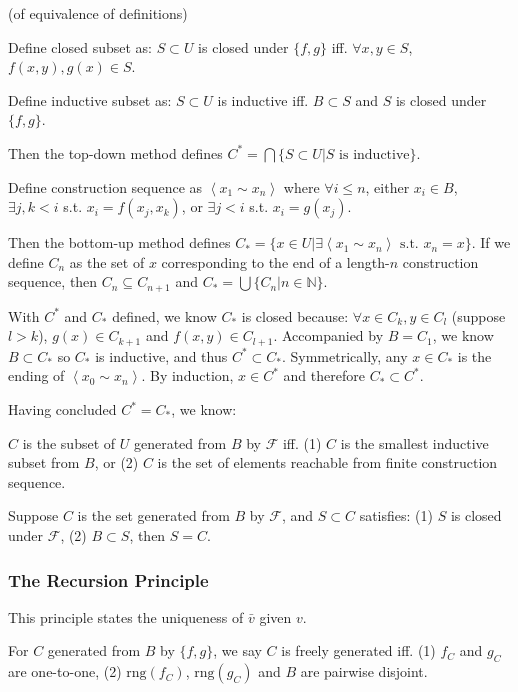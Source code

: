 \documentclass{article}
\newcommand \mlist[1]				{\left\langle #1 \right\rangle}
\newcommand \ran[1]					{\text{rng}\left( #1 \right)}
\begin{document}
\Proof (of equivalence of definitions)

Define closed subset as:
	$S \subset U$ is closed under $\{f,g\}$ iff. $\forall x,y\in S$, $f(x,y), g(x)\in S$.
	
Define inductive subset as:
	$S \subset U$ is inductive iff. $B \subset S$ and $S$ is closed under $\{f,g\}$.
	
	Then the top-down method defines $C^*= \bigcap \{ S\subset U | S \text{ is inductive}\}$.
	
Define construction sequence as $\mlist{x_1\sim x_n}$ where $\forall i \le n$, either  $x_i \in B$,  $\exists j, k<i$ s.t. $x_i=f(x_j,x_k)$, or  $\exists j<i$ s.t. $x_i = g(x_j)$.

	Then the bottom-up method defines $C_*=\{ x \in U | \exists \mlist{x_1\sim x_n} \text{ s.t. } x_n=x\}$. If we define $C_n$ as the set of $x$ corresponding to the end of a length-$n$ construction sequence, then $C_n \subseteq C_{n+1}$ and $C_* = \bigcup \{C_n | n \in \mathbb{N}\}$.
	
	With $C^*$ and $C_*$ defined, we know $C_*$ is closed because: $\forall x \in C_k, y \in C_l$ (suppose $l>k$), $g(x) \in C_{k+1}$ and $f(x,y) \in C_{l+1}$. Accompanied by $B=C_1$, we know $B\subset C_*$ so $C_*$ is inductive, and thus $C^* \subset C_*$. Symmetrically, any $x\in C_*$ is the ending of $\mlist{x_0\sim x_n}$. By induction, $x \in C^*$ and therefore $C_* \subset C^*$.
	
\QED

Having concluded $C^*=C_*$, we know:

	$C$ is the subset of $U$ generated from $B$ by $\mathcal{F}$ iff. (1) $C$ is the smallest inductive subset from $B$, or (2) $C$ is the set of elements reachable from finite construction sequence.

	Suppose $C$ is the set generated from $B$ by $\mathcal{F}$, and $S \subset C$ satisfies: (1) $S$ is closed under $\mathcal{F}$, (2) $B \subset S$, then $S=C$.
	

\subsubsection{The Recursion Principle}

This principle states the uniqueness of $\bar{v}$ given $v$.

	For $C$ generated from $B$ by $\{f, g\}$, we say $C$ is freely generated iff. (1) $f_C$ and $g_C$ are one-to-one, (2) $\ran{f_C}$, $\ran{g_C}$ and $B$ are pairwise disjoint.
	
\end{document}
